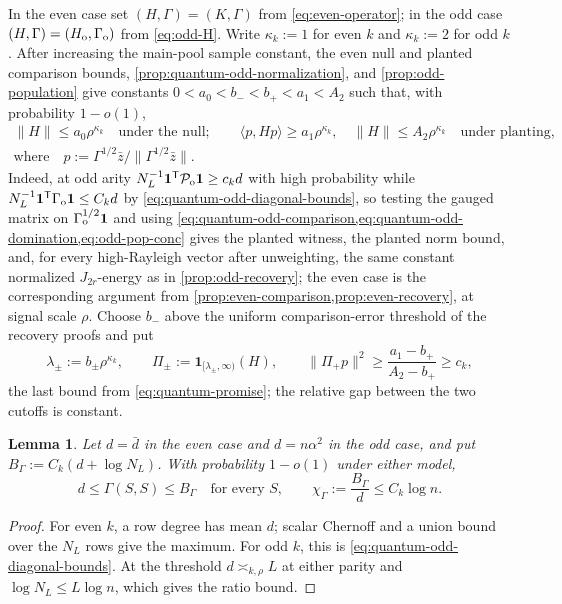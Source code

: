 \documentclass[11pt]{article}
\newtheorem{lemma}[lemma]{Lemma}
\theoremstyle{definition}
\theoremstyle{remark}
\newcommand{\1}{\mathbf 1}
\newcommand{\cP}{\mathcal P}
\newcommand{\bd}{\bar d}
\numberwithin{equation}{section}
\begin{document}
In the even case set $(H,\Gamma)=(K,\Gamma)$ from
\cref{eq:even-operator}; in the odd case
$(H,\Gamma)=(H_{\rm o},\Gamma_{\rm o})$ from \cref{eq:odd-H}.  Write
$\kappa_k:=1$ for even $k$ and $\kappa_k:=2$ for odd $k$.  After
increasing the main-pool sample constant, the even null and planted
comparison bounds, \cref{prop:quantum-odd-normalization}, and
\cref{prop:odd-population} give constants
$0<a_0<b_-<b_+<a_1<A_2$ such that, with probability $1-o(1)$,
\begin{equation}\label{eq:quantum-promise}
\begin{gathered}
 \|H\|\le a_0\rho^{\kappa_k}\quad\text{under the null};
 \qquad
 \langle p,Hp\rangle\ge a_1\rho^{\kappa_k},
 \quad
 \|H\|\le A_2\rho^{\kappa_k}
 \quad\text{under planting},\\
 \text{where}\quad
 p:=\Gamma^{1/2}\bar z/\|\Gamma^{1/2}\bar z\| .
\end{gathered}
\end{equation}
Indeed, at odd arity
$N_L^{-1}\1^{\mathsf T}\cP_{\rm o}\1\ge c_kd$ with high probability
while $N_L^{-1}\1^{\mathsf T}\Gamma_{\rm o}\1\le C_kd$ by
\cref{eq:quantum-odd-diagonal-bounds}, so testing the gauged matrix on
$\Gamma_{\rm o}^{1/2}\1$ and using
\cref{eq:quantum-odd-comparison,eq:quantum-odd-domination,eq:odd-pop-conc}
gives the planted witness, the planted norm bound, and, for every
high-Rayleigh vector after unweighting, the same constant normalized
$J_{2r}$-energy as in \cref{prop:odd-recovery}; the even case is the
corresponding argument from
\cref{prop:even-comparison,prop:even-recovery}, at signal scale $\rho$.
Choose $b_-$ above the uniform comparison-error threshold of the
recovery proofs and put
\begin{equation}\label{eq:two-cutoffs}
 \lambda_\pm:=b_\pm\rho^{\kappa_k},
 \qquad
 \Pi_\pm:=\1_{[\lambda_\pm,\infty)}(H),
 \qquad
 \|\Pi_+p\|^2\ge\frac{a_1-b_+}{A_2-b_+}\ge c_k,
\end{equation}
the last bound from \cref{eq:quantum-promise}; the relative gap between
the two cutoffs is constant.

\begin{lemma}\label{lem:quantum-condition-number}
Let $d=\bd$ in the even case and $d=n\alpha^2$ in the odd case, and put
$B_\Gamma:=C_k(d+\log N_L)$.  With probability $1-o(1)$ under either
model,
\begin{equation}\label{eq:quantum-condition-number}
 d\le\Gamma(S,S)\le B_\Gamma\quad\text{for every }S,
 \qquad
 \chi_\Gamma:=\frac{B_\Gamma}d\le C_k\log n.
\end{equation}
\end{lemma}
\begin{proof}
For even $k$, a row degree has mean $d$; scalar Chernoff and a union
bound over the $N_L$ rows give the maximum.  For odd $k$, this is
\cref{eq:quantum-odd-diagonal-bounds}.  At the threshold
$d\asymp_{k,\rho}L$ at either parity and $\log N_L\le L\log n$, which
gives the ratio bound.
\end{proof}
\end{document}

